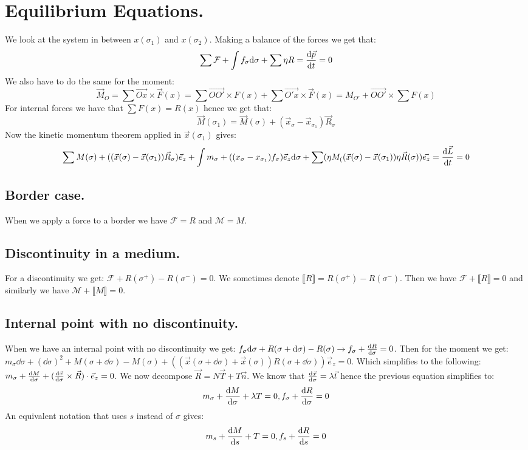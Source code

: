 \documentclass[10pt,a4paper]{book}
\begin{document}
\section{Equilibrium Equations.}
We look at the system in between $x(\sigma_1)$ and $x(\sigma_2)$. Making a balance of the forces we get that:
\[
\sum \mathcal{F} + \int f_\sigma \dd \sigma + \sum \eta R = \dv{\vec{p}}{t} = 0
\]
We also have to do the same for the moment:
\[
\vec{M}_O = \sum \vec{Ox} \times \vec{F}(x) = \sum \vec{OO'} \times F(x) + \sum \vec{O'x} \times \vec{F}(x) = M_{O'} + \vec{OO'} \times \sum F(x)
\]
For internal forces we have that $\sum F(x) = R(x)$ hence we get that:
\[
\vec{M}(\sigma_1) = \vec{M}(\sigma) + (\vec{x}_\sigma - \vec{x}_{\sigma_1}) \vec{R}_\sigma
\]
Now the kinetic momentum theorem applied in $\vec{x}(\sigma_1)$ gives:
\[
\sum M(\sigma) + ((\vec{x}(\sigma) - \vec{x}(\sigma_{1})) \vec{R}_\sigma) \vec{e}_z + \int m_\sigma + ((x_\sigma - x_{\sigma_1}) f_\sigma) \vec{e}_z \dd \sigma + \sum (\eta M _ ((\vec{x}(\sigma) - \vec{x}(\sigma_1) ) \eta \vec{R}(\sigma)) \vec{e_z} = \dv{\vec{L}}{t} = 0
\]

\subsection{Border case.}
When we apply a force to a border we have $\mathcal{F} = R$ and $\mathcal{M} = M$.

\subsection{Discontinuity in a medium.}
For a discontinuity we get: $\mathcal{F} + R(\sigma^+) - R(\sigma^-) = 0$. We sometimes denote $\llbracket R \rrbracket = R(\sigma^+) - R(\sigma^-)$. Then we have $\mathcal{F} + \llbracket R \rrbracket = 0$ and similarly we have $\mathcal{M} + \llbracket  M \rrbracket = 0$.

\subsection{Internal point with no discontinuity.}
When we have an internal point with no discontinuity we get: $f_\sigma \dd \sigma + R(\sigma + \dd \sigma) - R(\sigma) \rightarrow f_\sigma + \dv{R}{\sigma} = 0$. Then for the moment we get: $m_\sigma \dd \sigma + (\dd \sigma)^2 + M(\sigma + \dd \sigma) - M(\sigma) + ((\vec{x}(\sigma + \dd \sigma) + \vec{x}(\sigma)) R(\sigma + \dd \sigma)) \vec{e}_z = 0$. Which simplifies to the following: $m_\sigma + \dv{M}{\sigma} + (\dv{\vec{x}}{\sigma} \times \vec{R}) \cdot \vec{e}_z = 0$. We now decompose $\vec{R} = N \vec{T} + T \vec{n}$. We know that $\dv{\vec{x}}{\sigma} = \lambda \vec{t}$ hence the previous equation simplifies to:
\[
m_\sigma + \dv{M}{\sigma} + \lambda T = 0, f_\sigma + \dv{R}{\sigma} = 0
\]
An equivalent notation that uses $s$ instead of $\sigma$ gives:
\[
m_s + \dv{M}{s} + T = 0, f_s + \dv{R}{s} = 0
\]
\end{document}
